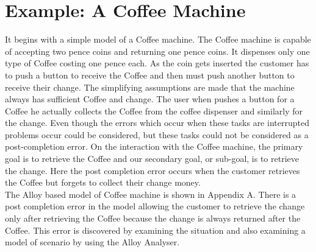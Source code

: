 \documentclass[a4paper,12pt]{extarticle}
\begin{document}
\section{Example: A Coffee Machine}
\label{Ex: Coffee machine}
It begins with a simple model of a Coffee machine. The Coffee machine is capable of accepting two pence coins and returning one pence coins. It dispenses only one type of Coffee costing one pence each. As the coin gets inserted the customer has to push a button to receive the Coffee and then must push another button to receive their change. The simplifying assumptions are made that the machine always has sufficient Coffee and change. The user when pushes a button for a Coffee he actually collects the Coffee from the coffee dispenser and similarly for the change. Even though the errors which occur when these tasks are interrupted problems occur could be considered, but these tasks could not be considered as a post-completion error. On the interaction with the Coffee machine, the primary goal is to retrieve the Coffee and our secondary goal, or sub-goal, is to retrieve the change. Here the post completion error occurs when the customer retrieves the Coffee but forgets to collect their change money. \\
The Alloy based model of Coffee machine is shown in Appendix A. There is a post completion error in the model allowing the customer to retrieve the change only after retrieving the Coffee because the change is always returned after the Coffee. This error is discovered by examining the situation and also examining a model of scenario by using the Alloy Analyser. 
\end{document}
